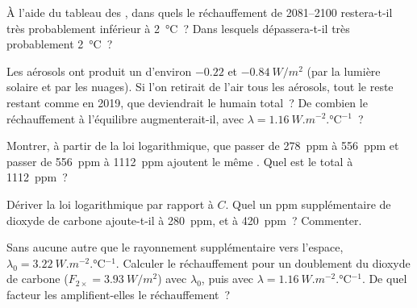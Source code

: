 \begin{exercise}[$\star\star$]\label{exo:g12:climate-change:11}
À l'aide du tableau des , dans quels  le réchauffement
de 2081--2100 restera-t-il très probablement inférieur à
\qty{2}{\degreeCelsius}~? Dans lesquels dépassera-t-il très probablement
\qty{2}{\degreeCelsius}~?
\end{exercise}

\begin{exercise}[$\star\star\star$]\label{exo:g12:climate-change:12}
Les aérosols ont produit un  d'environ $-0.22$ et $\qty{-0.84}{W/m^2}$
(par la lumière solaire et par les nuages). Si l'on retirait de l'air tous
les aérosols, tout le reste restant comme en 2019, que deviendrait le
 humain total~? De combien le réchauffement à l'équilibre
augmenterait-il, avec
$\lambda = \qty{1.16}{W.m^{-2}.\degreeCelsius^{-1}}$~?
\end{exercise}

\begin{exercise}[$\star\star\star$]\label{exo:g12:climate-change:13}
Montrer, à partir de la loi logarithmique, que passer de \qty{278}{ppm} à
\qty{556}{ppm} et passer de \qty{556}{ppm} à \qty{1112}{ppm} ajoutent le
même . Quel est le  total à \qty{1112}{ppm}~?
\end{exercise}

\begin{exercise}[$\star\star\star$]\label{exo:g12:climate-change:14}
Dériver la loi logarithmique par rapport à $C$. Quel  un ppm
supplémentaire de dioxyde de carbone ajoute-t-il à \qty{280}{ppm}, et à
\qty{420}{ppm}~? Commenter.
\end{exercise}

\begin{exercise}[$\star\star\star$]\label{exo:g12:climate-change:15}
Sans aucune  autre que le rayonnement supplémentaire vers
l'espace, $\lambda_0 = \qty{3.22}{W.m^{-2}.\degreeCelsius^{-1}}$. Calculer
le réchauffement pour un doublement du dioxyde de carbone
($F_{2\times} = \qty{3.93}{W/m^2}$) avec $\lambda_0$, puis avec
$\lambda = \qty{1.16}{W.m^{-2}.\degreeCelsius^{-1}}$. De quel facteur les
 amplifient-elles le réchauffement~?
\end{exercise}

